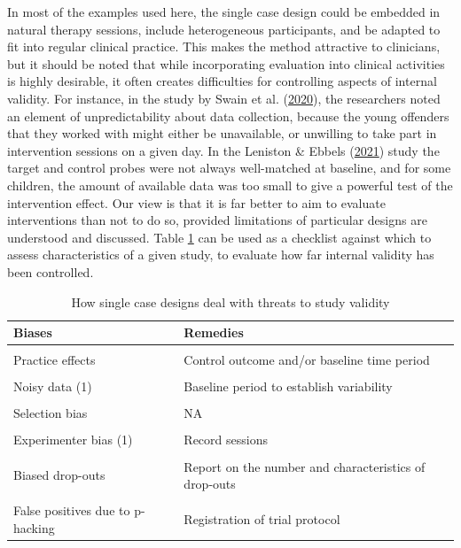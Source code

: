 \documentclass{krantz}
\begin{document}
In most of the examples used here, the single case design could be embedded in natural therapy sessions, include heterogeneous participants, and be adapted to fit into regular clinical practice. This makes the method attractive to clinicians, but it should be noted that while incorporating evaluation into clinical activities is highly desirable, it often creates difficulties for controlling aspects of internal validity. For instance, in the study by Swain et al. (\protect\hyperlink{ref-swain2020}{2020}), the researchers noted an element of unpredictability about data collection, because the young offenders that they worked with might either be unavailable, or unwilling to take part in intervention sessions on a given day. In the Leniston \& Ebbels (\protect\hyperlink{ref-leniston2021}{2021}) study the target and control probes were not always well-matched at baseline, and for some children, the amount of available data was too small to give a powerful test of the intervention effect. Our view is that it is far better to aim to evaluate interventions than not to do so, provided limitations of particular designs are understood and discussed. Table \ref{tab:singlecasechart} can be used as a checklist against which to assess characteristics of a given study, to evaluate how far internal validity has been controlled.

\begin{table}

\caption{\label{tab:singlecasechart}How single case designs deal with threats to study validity}
\centering
\begin{tabular}[t]{>{\centering\arraybackslash}p{9em}>{\centering\arraybackslash}p{15em}}
\toprule
Biases & Remedies\\
\midrule
\cellcolor{gray!6}{Spontaneous improvement} & \cellcolor{gray!6}{Control outcome and/or baseline time period}\\
Practice effects & Control outcome and/or baseline time period\\
\cellcolor{gray!6}{Regression to the mean} & \cellcolor{gray!6}{Control outcome and/or baseline time period}\\
Noisy data (1) & Baseline period to establish variability\\
\cellcolor{gray!6}{Noisy data (2)} & \cellcolor{gray!6}{Outcomes with low measurement error}\\
\addlinespace
Selection bias & NA\\
\cellcolor{gray!6}{Placebo effects} & \cellcolor{gray!6}{-}\\
Experimenter bias (1) & Record sessions\\
\cellcolor{gray!6}{Experimenter bias (2)} & \cellcolor{gray!6}{Strictly specified protocol}\\
Biased drop-outs & Report on the number and characteristics of drop-outs\\
\addlinespace
\cellcolor{gray!6}{Low power} & \cellcolor{gray!6}{A priori power analysis; need for many observations}\\
False positives due to p-hacking & Registration of trial protocol\\
\bottomrule
\end{tabular}
\end{table}
\end{document}
